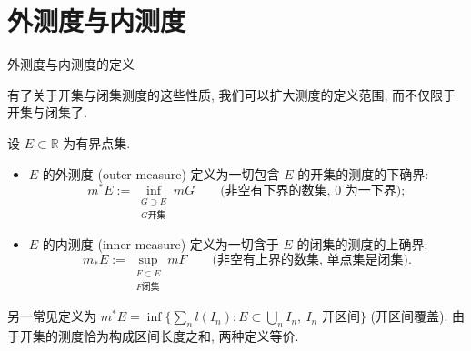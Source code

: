 \section[外内测度]{外测度与内测度}


\begin{frame}{外测度与内测度的定义}

有了关于开集与闭集测度的这些性质, 我们可以\alert{扩大测度的定义范围}, 而不仅限于开集与闭集了.

\pause

\begin{Def}[外测度与内测度]
设 $E \subset \mathbb{R}$ 为有界点集.
\begin{itemize}
\item $E$ 的\alert{外测度} (outer measure) 定义为一切包含 $E$ 的开集的测度的下确界:
\[
m^* E := \inf_{\substack{G \supset E \\ G \text{开集}}} m G
\qquad \text{(非空有下界的数集, $0$ 为一下界)};
\]
\item $E$ 的\alert{内测度} (inner measure) 定义为一切含于 $E$ 的闭集的测度的上确界:
\[
m_* E := \sup_{\substack{F \subset E \\ F \text{闭集}}} m F
\qquad \text{(非空有上界的数集, 单点集是闭集)}.
\]
\end{itemize}
\end{Def}

\begin{remark}
另一常见定义为 $m^* E = \inf\big\{\sum_n l(I_n) : E \subset \bigcup_n I_n,\ I_n \text{ 开区间}\big\}$ (开区间覆盖). 由于开集的测度恰为构成区间长度之和, 两种定义等价.
\end{remark}

\end{frame}



